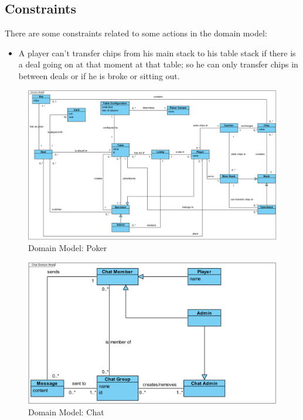 \documentclass[a4paper,11pt]{report}
\begin{document}
\subsection{Constraints}
There are some constraints related to some actions in the domain model:
\begin{itemize}
\item A player can't transfer chips from his main stack to his table stack if there is a deal going on at that moment at that table; so he can only transfer chips in between deals or if he is broke or sitting out.
\end{itemize}
\begin{figure}
  \begin{center}
    \includegraphics[angle=90, scale=0.6]{img_domain_model_poker.png}
  \end{center}
  \caption{Domain Model: Poker}\label{fig:domain_poker}
\end{figure}
\begin{figure}
  \begin{center}
    \includegraphics[scale=0.5]{img_domain_model_chat.png}
  \end{center}
  \caption{Domain Model: Chat}\label{fig:domain_chat}
\end{figure}
\end{document}
